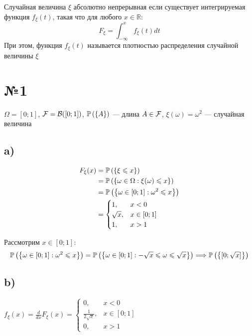 \documentclass[a4paper, 10pt]{article}
\begin{document}
 Случайная величина $\xi$ абсолютно непрерывная если существует интегрируемая функция $f_{\xi}(t)$, такая что для любого $x\in\mathbb{R}$:
\begin{equation*}
    F_{\xi}=\int_{-\infty}^{x}f_{\xi}(t)dt
\end{equation*}
При этом, функция $f_{\xi}(t)$ называется плотностью распределения случайной величины $\xi$

\section*{№1}
$\Omega=[0;1]$, $\mathcal{F}=\mathcal{B}([0;1])$, $\mathbb{P}\left(\left\{A\right\}\right)$ — длина $A\in\mathcal{F}$, $\xi(\omega)=\omega^2$ — случайная величина

\subsection*{a)}
\begin{equation*}
    \begin{aligned}
        F_{\xi}(x)&=\mathbb{P}\left(\left\{\xi\leqslant x\right\}\right)\\
        &=\mathbb{P}\left(\left\{\omega\in\Omega:\xi(\omega)\leqslant x\right\}\right)\\
        &=\mathbb{P}\left(\left\{\omega\in[0;1]:\omega^2\leqslant x\right\}\right)\\
        &=\begin{cases}
            1,&x<0\\
            \sqrt{x},&x\in[0;1]\\
            1,&x>1
        \end{cases}
    \end{aligned}
\end{equation*}

Рассмотрим $x\in[0;1]:$
\begin{equation*}
    \begin{aligned}
        \mathbb{P}\left(\left\{\omega\in[0;1]:\omega^2\leqslant x\right\}\right)=\mathbb{P}\left(\left\{\omega\in[0;1]:-\sqrt{x}\leqslant \omega\leqslant\sqrt{x}\right\}\right)\Longrightarrow\mathbb{P}\left(\left\{[0;\sqrt{x}]\right\}\right)
    \end{aligned}
\end{equation*}


\subsection*{b)}
$f_{\xi}(x)=\displaystyle\frac{d}{dx}F_{\xi}(x)=\begin{cases}
    0,&x<0\\
    \frac{1}{2\sqrt{x}},&x\in[0;1]\\
    0,&x>1
\end{cases}$
\end{document}
